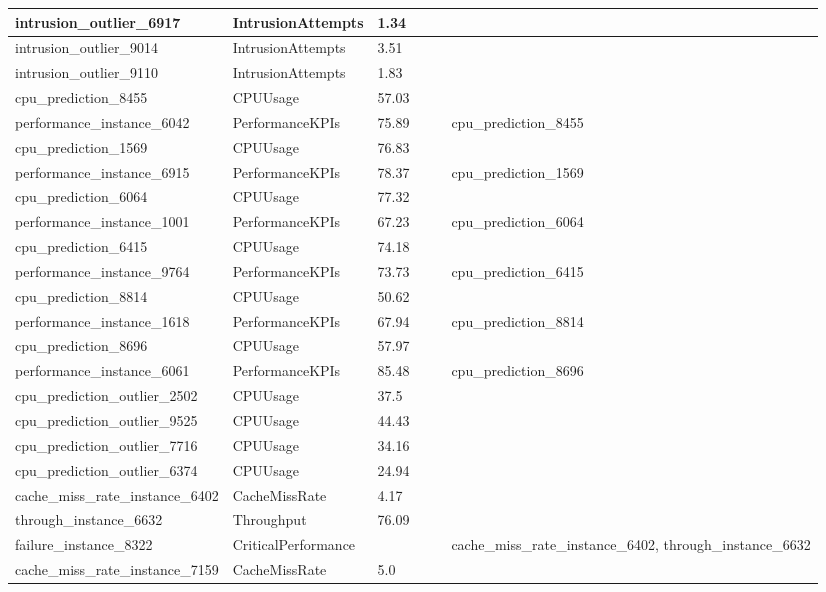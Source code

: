 \begin{longtable}{|l|p{2cm}|l|l|p{3cm}|p{3cm}|}
intrusion\_outlier\_6917 & IntrusionAttempts & 1.34 &  &  &  \\ \hline
intrusion\_outlier\_9014 & IntrusionAttempts & 3.51 &  &  &  \\ \hline
intrusion\_outlier\_9110 & IntrusionAttempts & 1.83 &  &  &  \\ \hline
cpu\_prediction\_8455 & CPUUsage & 57.03 &  &  &  \\ \hline
performance\_instance\_6042 & PerformanceKPIs & 75.89 &  &  & cpu\_prediction\_8455 \\ \hline
cpu\_prediction\_1569 & CPUUsage & 76.83 &  &  &  \\ \hline
performance\_instance\_6915 & PerformanceKPIs & 78.37 &  &  & cpu\_prediction\_1569 \\ \hline
cpu\_prediction\_6064 & CPUUsage & 77.32 &  &  &  \\ \hline
performance\_instance\_1001 & PerformanceKPIs & 67.23 &  &  & cpu\_prediction\_6064 \\ \hline
cpu\_prediction\_6415 & CPUUsage & 74.18 &  &  &  \\ \hline
performance\_instance\_9764 & PerformanceKPIs & 73.73 &  &  & cpu\_prediction\_6415 \\ \hline
cpu\_prediction\_8814 & CPUUsage & 50.62 &  &  &  \\ \hline
performance\_instance\_1618 & PerformanceKPIs & 67.94 &  &  & cpu\_prediction\_8814 \\ \hline
cpu\_prediction\_8696 & CPUUsage & 57.97 &  &  &  \\ \hline
performance\_instance\_6061 & PerformanceKPIs & 85.48 &  &  & cpu\_prediction\_8696 \\ \hline
cpu\_prediction\_outlier\_2502 & CPUUsage & 37.5 &  &  &  \\ \hline
cpu\_prediction\_outlier\_9525 & CPUUsage & 44.43 &  &  &  \\ \hline
cpu\_prediction\_outlier\_7716 & CPUUsage & 34.16 &  &  &  \\ \hline
cpu\_prediction\_outlier\_6374 & CPUUsage & 24.94 &  &  &  \\ \hline
cache\_miss\_rate\_instance\_6402 & CacheMissRate & 4.17 &  &  &  \\ \hline
through\_instance\_6632 & Throughput & 76.09 &  &  &  \\ \hline
failure\_instance\_8322 & CriticalPerformance &  &  &  & cache\_miss\_rate\_instance\_6402, through\_instance\_6632 \\ \hline
cache\_miss\_rate\_instance\_7159 & CacheMissRate & 5.0 &  &  &  \\ \hline

\end{longtable}
